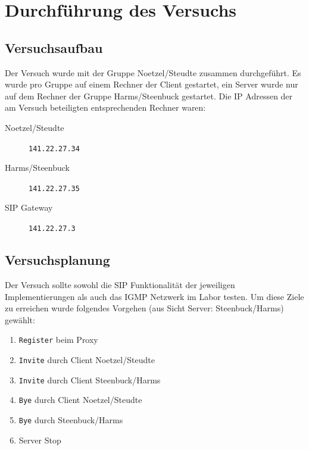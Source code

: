\documentclass[10pt]{scrartcl}
\author{André Harms, Oliver Steenbuck}
\title{\titletext}
\date{04.01.2012}
\begin{document}
\maketitle

\setcounter{tocdepth}{3}
\tableofcontents

	\listoffigures   

\section{Durchführung des Versuchs}

\subsection{Versuchsaufbau}\label{subsec:versuchsaufbau}
Der Versuch wurde mit der Gruppe Noetzel/Steudte zusammen durchgeführt.
Es wurde pro Gruppe auf einem Rechner der Client gestartet, ein Server wurde nur auf dem Rechner der Gruppe Harms/Steenbuck gestartet. Die IP Adressen der am Versuch beteiligten entsprechenden Rechner waren:
\begin{description}
	\item[Noetzel/Steudte] \verb!141.22.27.34!
	\item[Harms/Steenbuck] \verb!141.22.27.35!
	\item[SIP Gateway] \verb!141.22.27.3!
\end{description}

\subsection{Versuchsplanung} \label{subsec:versuchplanung}
Der Versuch sollte sowohl die SIP Funktionalität der jeweiligen Implementierungen als auch das IGMP Netzwerk im Labor testen. Um diese Ziele zu erreichen wurde folgendes Vorgehen (aus Sicht Server: Steenbuck/Harms) gewählt:

\begin{enumerate}
	\item \verb!Register! beim Proxy
	\item \verb!Invite! durch Client Noetzel/Steudte
	\item \verb!Invite! durch Client Steenbuck/Harms
	\item \verb!Bye! durch Client Noetzel/Steudte
	\item \verb!Bye! durch Steenbuck/Harms
	\item Server Stop
\end{enumerate}
\end{document}
